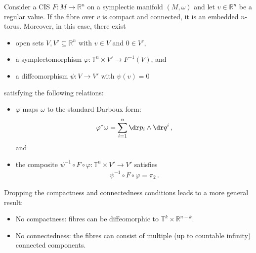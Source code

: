     \begin{theorem}
        Consider a CIS $F:M\rightarrow\mathbb{R}^n$ on a symplectic manifold $(M,\omega)$ and let $v\in\mathbb{R}^n$ be a regular value. If the fibre over $v$ is compact and connected, it is an embedded $n$-torus. Moreover, in this case, there exist
        \begin{itemize}
            \item open sets $V,V'\subseteq\mathbb{R}^n$ with $v\in V$ and $0\in V'$,
            \item a symplectomorphism $\varphi:\mathbb{T}^n\times V'\rightarrow F^{-1}(V)$, and
            \item a diffeomorphism $\psi:V\rightarrow V'$ with $\psi(v)=0$
        \end{itemize}
        satisfying the following relations:
        \begin{itemize}
            \item $\varphi$ maps $\omega$ to the standard Darboux form:
                \begin{gather}
                    \varphi^*\omega = \sum_{i=1}^n\dr p_i\wedge\dr q^i\,,
                \end{gather}
            and
            \item the composite $\psi^{-1}\circ F\circ\varphi:\mathbb{T}^n\times V'\rightarrow V'$ satisfies
                \begin{gather}
                    \label{symplectic:liouville_arnold_hamiltonian}
                    \psi^{-1}\circ F\circ\varphi = \pi_2\,.
                \end{gather}
        \end{itemize}
    \end{theorem}
    \begin{remark}
        Dropping the compactness and connectedness conditions leads to a more general result:
        \begin{itemize}
            \item No compactness: fibres can be diffeomorphic to $\mathbb{T}^k\times\mathbb{R}^{n-k}$.
            \item No connectedness: the fibres can consist of multiple (up to countable infinity) connected components.
        \end{itemize}
    \end{remark}

